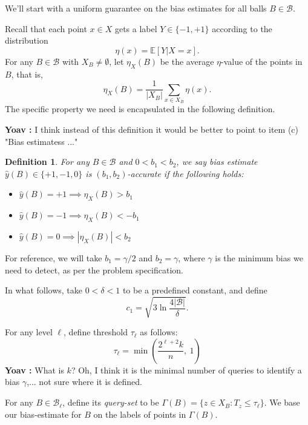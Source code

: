 \documentclass{article}
\def\E{{\mathbb E}}
\def\B{{\mathcal B}}
\def\yh{{\widehat{y}}}
\newtheorem{defn}[thm]{Definition}
\newcommand{\comment}[3]{{\color{#1} {\bf #2 :} #3}}
\newcommand{\yoav}[1]{\comment{cyan}{Yoav}{#1}}
\begin{document}
We'll start with a uniform guarantee on the bias estimates for all balls $B \in \B$.

Recall that each point $x \in X$ gets a label $Y \in \{-1,+1\}$ according to the distribution
$$ \eta(x) = \E[Y | X=x].$$ 
For any $B \in \B$ with $X_B \neq \emptyset$, let $\eta_X(B)$ be the average $\eta$-value of the points in $B$, that is,
$$ \eta_X(B) = \frac{1}{|X_B|} \sum_{x \in X_B} \eta(x) .$$
The specific property we need is encapsulated in the following definition.

\yoav{I think instead of this definition it would be  better to point to item (c) "Bias estimatess ..."}
\begin{defn}
For any $B \in \B$ and $0 < b_1 < b_2$, we say bias estimate $\yh(B) \in \{+1,-1,0\}$ is \emph{$(b_1,b_2)$-accurate} if the following holds:
\begin{itemize}
\item $\yh(B) = +1 \implies \eta_X(B) > b_1$
\item $\yh(B) = -1 \implies \eta_X(B) < -b_1$
\item $\yh(B) = 0 \implies |\eta_X(B)| < b_2$
\end{itemize}
\label{def:accurate-bias-estimate}
\end{defn}
For reference, we will take $b_1 = \gamma/2$ and $b_2 = \gamma$, where $\gamma$ is the minimum bias we need to detect, as per the problem specification.

In what follows, take $0 < \delta < 1$ to be a predefined constant, and define
\begin{equation}
c_1 = \sqrt{3 \ln \frac{4|\B|}{\delta}} .
\label{eq:c1}
\end{equation}

For any level $\ell$, define threshold $\tau_\ell$ as follows:
\begin{equation}
\tau_\ell = \min \left( \frac{2^{\ell+2}k}{n}, \ 1 \right)
\label{eq:threshold-ell}
\end{equation}
\yoav{What is $k$? Oh, I think it is the minimal number of queries to identify a bias $\gamma$,... not sure where it is defined.}

For any $B \in \B_\ell$, define its \emph{query-set} to be $\Gamma(B) = \{z \in X_B: T_z \leq \tau_\ell\}$. We base our bias-estimate for $B$ on the labels of points in $\Gamma(B)$.
\end{document}
